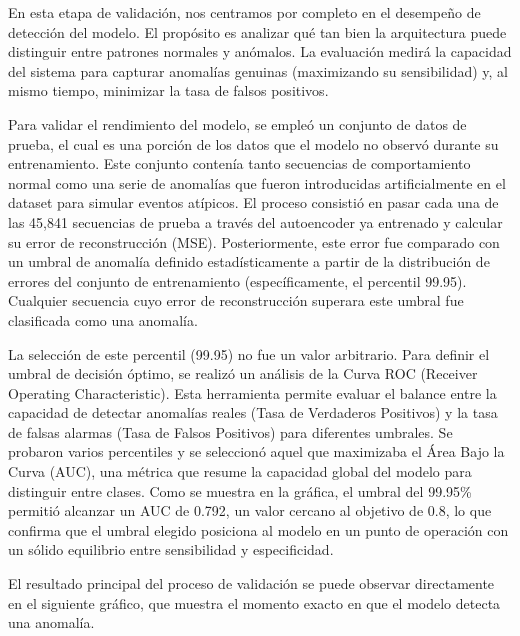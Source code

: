 

En esta etapa de validación, nos centramos por completo en el desempeño de detección del modelo. El propósito es analizar qué tan bien la arquitectura puede distinguir entre patrones normales y anómalos. La evaluación medirá la capacidad del sistema para capturar anomalías genuinas (maximizando su sensibilidad) y, al mismo tiempo, minimizar la tasa de falsos positivos.


Para validar el rendimiento del modelo, se empleó un conjunto de datos de prueba, el cual es una porción de los datos que el modelo no observó durante su entrenamiento. Este conjunto contenía tanto secuencias de comportamiento normal como una serie de anomalías que fueron introducidas artificialmente en el dataset para simular eventos atípicos.
El proceso consistió en pasar cada una de las 45,841 secuencias de prueba a través del autoencoder ya entrenado y calcular su error de reconstrucción (MSE). Posteriormente, este error fue comparado con un umbral de anomalía definido estadísticamente a partir de la distribución de errores del conjunto de entrenamiento (específicamente, el percentil 99.95). Cualquier secuencia cuyo error de reconstrucción superara este umbral fue clasificada como una anomalía.

La selección de este percentil (99.95) no fue un valor arbitrario. Para definir el umbral de decisión óptimo, se realizó un análisis de la Curva ROC (Receiver Operating Characteristic). Esta herramienta permite evaluar el balance entre la capacidad de detectar anomalías reales (Tasa de Verdaderos Positivos) y la tasa de falsas alarmas (Tasa de Falsos Positivos) para diferentes umbrales. Se probaron varios percentiles y se seleccionó aquel que maximizaba el Área Bajo la Curva (AUC), una métrica que resume la capacidad global del modelo para distinguir entre clases. Como se muestra en la gráfica, el umbral del 99.95\% permitió alcanzar un AUC de 0.792, un valor cercano al objetivo de 0.8, lo que confirma que el umbral elegido posiciona al modelo en un punto de operación con un sólido equilibrio entre sensibilidad y especificidad.

El resultado principal del proceso de validación se puede observar directamente en el siguiente gráfico, que muestra el momento exacto en que el modelo detecta una anomalía.

